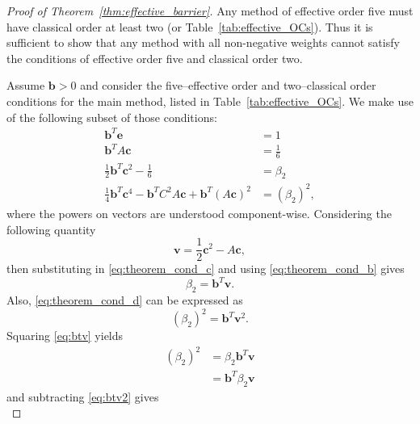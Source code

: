 \begin{proof}[Proof of Theorem~\ref{thm:effective_barrier}]
	Any method of effective order five must have classical order at least two
	\cite{Butcher2008_book} (or Table~\ref{tab:effective_OCs}).
    Thus it is sufficient to show that any method with all non-negative weights
    cannot satisfy the conditions of effective order five and classical order two.

    Assume $\bm{b} > 0$ and consider the five--effective order and two--classical 
    order conditions for the main method, listed in Table~\ref{tab:effective_OCs}.  
    We make use of the following subset of those conditions:
    \begin{subequations}\label{eq:theorem_cond}
    		\begin{align}
    			\bm{b}^T\bm{e} & = 1 \label{eq:theorem_cond_a} \\
             	\bm{b}^TA\bm{c} &= \frac{1}{6} \label{eq:theorem_cond_b} \\
            	\frac{1}{2}\bm{b}^T\bm{c}^2 - \frac{1}{6} &= \beta_2 \label{eq:theorem_cond_c} \\
            	\frac{1}{4}\bm{b}^T\bm{c}^4 - \bm{b}^TC^2A\bm{c} + \bm{b}^T(A\bm{c})^2 &= (\beta_2)^2, \label{eq:theorem_cond_d}
        	\end{align}
	\end{subequations}
	where the powers on vectors are understood component-wise. 
	Considering the following quantity
	\begin{equation*} 
		\bm{v} = \frac{1}{2}\bm{c}^2 - A\bm{c},
	\end{equation*}
	then substituting in \eqref{eq:theorem_cond_c} and using 
	\eqref{eq:theorem_cond_b} gives
	\begin{equation}\label{eq:btv}
		\beta_2 = \bm{b}^T\bm{v}.
	\end{equation}
	Also, \eqref{eq:theorem_cond_d} can be expressed as
	\begin{equation}\label{eq:btv2}
		(\beta_2)^2 = \bm{b}^T\bm{v}^2.
	\end{equation}
	Squaring \eqref{eq:btv} yields
	\begin{align*}
		(\beta_2)^2 &= \beta_2\bm{b}^T\bm{v} \\
				        &= \bm{b}^T\beta_2\bm{v}
	\end{align*}
	and subtracting \eqref{eq:btv2} gives
	\begin{equation}\label{eq:beta_2_subtraction}

\end{equation}
\end{proof}
